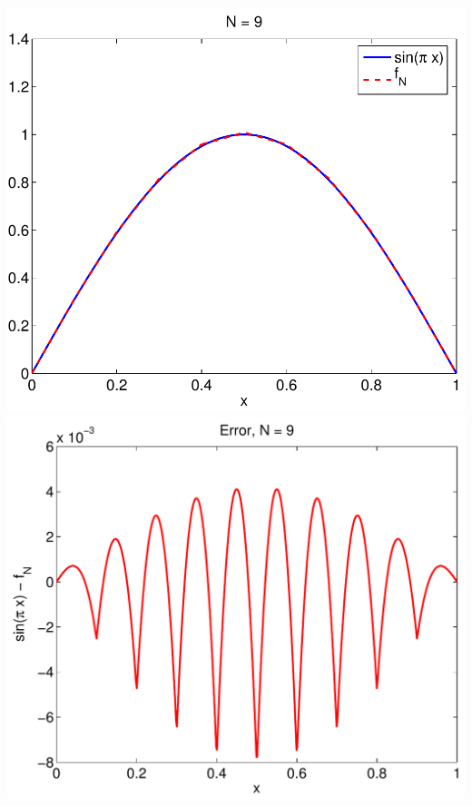 {\begin{solution}
\begin{enumerate}
\begin{center}
   \includegraphics[scale=0.4]{hats_9a}\quad 
   \includegraphics[scale=0.4]{hats_9b}
\end{center}


\end{enumerate}
\end{solution}}{}

